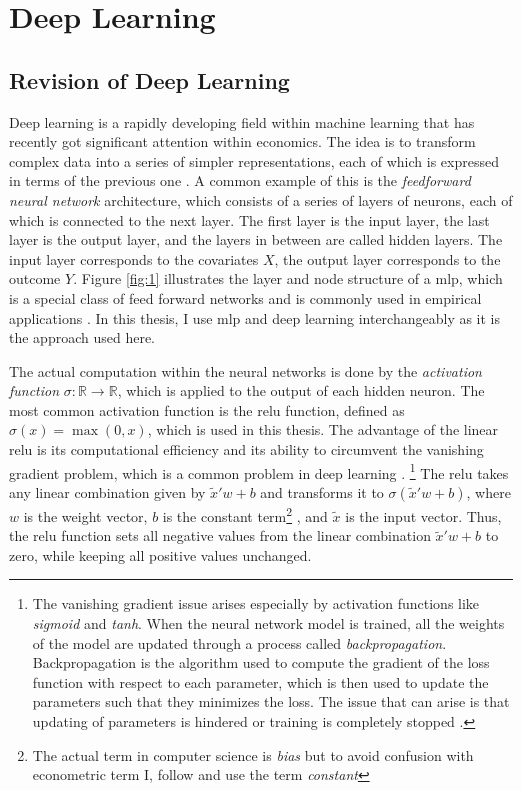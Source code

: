 \section{Deep Learning}

\subsection{Revision of Deep Learning}
Deep learning is a rapidly developing field within machine learning that has recently got significant attention within economics.
The idea is to transform complex data into a series of simpler representations, each of which is expressed in terms of the previous one \citep{Goodfellow-et-al-2016}.
A common example of this is the \textit{feedforward neural network} architecture, which consists of a series of layers of neurons, each of which is connected to the next layer.
The first layer is the input layer, the last layer is the output layer, and the layers in between are called hidden layers.
The input layer corresponds to the covariates $X$, the output layer corresponds to the outcome $Y$.
Figure \ref{fig:1} illustrates the layer and node structure of a \ac{mlp}, which is a special class of feed forward networks and is commonly used in empirical applications \citep{farrellDeepNeuralNetworks2021}.
In this thesis, I use \ac{mlp} and deep learning interchangeably as it is the approach used here.

The actual computation within the neural networks is done by the \textit{activation function} $ \sigma : \mathbb{R} \to \mathbb{R} $, which is applied to the output of each hidden neuron.
The most common activation function is the \ac{relu} function, defined as $ \sigma(x) = \max(0, x) $, which is used in this thesis.
The advantage of the linear \ac{relu} is its computational efficiency and its ability to circumvent the vanishing gradient problem, which is a common problem in deep learning \citep{10.1214/19-AOS1875}.
\footnote[1]{The vanishing gradient issue arises especially by activation functions like \textit{sigmoid} and \textit{tanh}.
When the neural network model is trained, all the weights of the model are updated through a process called \textit{backpropagation}.
Backpropagation is the algorithm used to compute the gradient of the loss function with respect to each parameter, which is then used to update the parameters such that they minimizes the loss.
The issue that can arise is that updating of parameters is hindered or training is completely stopped \citep{abuqaddom2021oriented}.}
The \ac{relu} takes any linear combination given by $\tilde{x}' w + b$ and transforms it to $ \sigma(\tilde{x}' w + b)$, where $w$ is the weight vector, $b$ is the constant term\footnote[2]{The actual term in computer science is \textit{bias} but to avoid confusion with econometric term I, follow \citet{farrellDeepNeuralNetworks2021} and use the term \textit{constant}}
, and $\tilde{x}$ is the input vector.
Thus, the \ac{relu} function sets all negative values from the linear combination $\tilde{x}' w + b$ to zero, while keeping all positive values unchanged.

